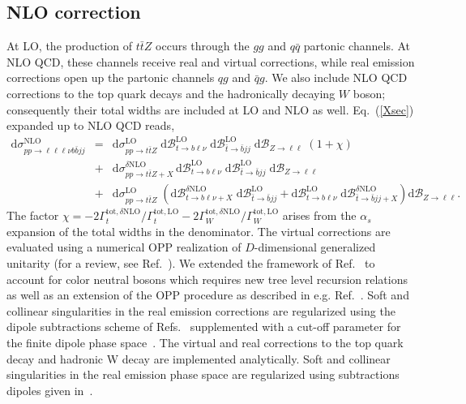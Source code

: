 \documentclass[preprint]{JHEP3} %
\newcommand{\mrm}{\mathrm}
\newcommand{\rd}{\mathrm{d}}
\newcommand{\Br}{\mathcal{B}}
\def\ttbZ{t\bar{t}Z}
\newcommand{\be}{\begin{eqnarray}}
\newcommand{\ee}{\end{eqnarray}}
\begin{document}
\subsection{NLO correction}
At LO, the production of $\ttbZ$ occurs through the $gg$ and $q\bar{q}$ partonic channels. 
At NLO QCD, these channels receive real and virtual corrections, while real emission corrections open up the partonic channels $qg$ and $\bar{q}g$. 
We also include NLO QCD corrections to the top quark decays and the hadronically decaying $W$ boson; consequently their total widths are included at LO and NLO as well.
Eq.~(\ref{Xsec}) expanded up to NLO QCD reads,
\be
 \rd \sigma_{pp\to\ell\ell\ell\nu b \bar{b} jj}^\mrm{NLO} &=& 
 \rd \sigma_{pp\to\ttbZ}^\mrm{LO} \; \rd\Br_{t\to b \ell\nu}^\mrm{LO} \; \rd\Br_{\bar{t} \to \bar{b} jj}^\mrm{LO} \; \rd\Br_{Z\to \ell\ell}
 \; \left( 1 + \chi \right)
\nonumber \\
 &+&   \rd \sigma_{pp\to\ttbZ+X}^{\delta \mrm{NLO}}  \, \rd\Br_{t\to b \ell\nu}^\mrm{LO} \; \rd\Br_{\bar{t} \to \bar{b} jj}^\mrm{LO} \; \rd\Br_{Z\to \ell\ell}
\nonumber \\
 &+&  \rd \sigma_{pp\to\ttbZ}^\mrm{LO} \; \left(  \rd\Br_{t\to b \ell\nu+X}^{\delta\mrm{NLO}} \; \rd\Br_{\bar{t} \to \bar{b} jj}^\mrm{LO} + \rd\Br_{t\to b \ell\nu}^\mrm{LO} \; \rd\Br_{\bar{t} \to \bar{b} jj+X}^{\delta\mrm{NLO}} \right) \rd\Br_{Z\to \ell\ell}
. \label{XsecNLO}
\ee
The factor $\chi= -2 \Gamma_t^{\mrm{tot},\delta\mrm{NLO}}/\Gamma_t^{\mrm{tot,LO}} -2 \Gamma_W^{\mrm{tot},\delta\mrm{NLO}}/\Gamma_W^{\mrm{tot,LO}} $ arises from the $\alpha_s$ expansion
of the total widths in the denominator.
The virtual corrections are evaluated using a numerical OPP realization \cite{Ossola:2006} of $D$-dimensional generalized unitarity \cite{Ellis:2007br,Giele:2008ve,Ellis:2008ir} (for a review, see Ref.~\cite{Ellis:2011}).
We extended the framework of Ref.~\cite{Melnikov:2009dn} to account for color neutral bosons which requires new tree level recursion relations as well as an extension of the OPP procedure as described in e.g. Ref.~\cite{}.
Soft and collinear singularities in the real emission corrections are regularized using the dipole subtractions scheme of Refs.~\cite{Catani:1996vz,Catani:2002hc} supplemented with a cut-off parameter for the
finite dipole phase space~\cite{Nagy:2003tz,Nagy:2003tz,copy from ttbphoton paper}.
The virtual and real corrections to the top quark decay and hadronic W decay are implemented analytically. Soft and collinear singularities in the real emission phase space are regularized using subtractions dipoles given in~\cite{see ttbphoton paper}.
\end{document}
